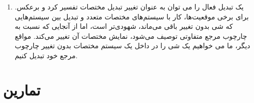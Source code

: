 {\begin{spacing}{1.5}
\begin{enumerate}[label=\textbf{\arabic*}.]
            \item {یک تبدیل فعال را می توان به عنوان تغییر تبدیل مختصات تفسیر کرد و برعکس.
            برای برخی موقعیت‌ها، کار با سیستم‌های مختصات متعدد و تبدیل بین سیستم‌هایی که شی بدون تغییر باقی می‌ماند، شهودی‌تر است،
            اما از آنجایی که نسبت به چارچوب مرجع متفاوتی توصیف می‌شود، نمایش مختصات آن تغییر می‌کند.
            مواقع دیگر، ما می خواهیم یک شی را در داخل یک سیستم مختصات بدون تغییر چارچوب مرجع خود تبدیل کنیم.}
        \end{enumerate}
    \end{spacing}
}
\newpage


\section{\textbf{تمارین}}
\label{sec:3.8}
